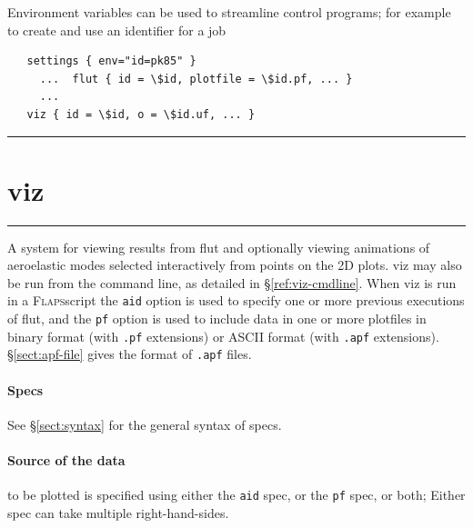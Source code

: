 \documentclass[11pt,openany,twoside]{book}
\makeatletter
\numberwithin{equation}{section}		%
\newcommand{\Cmd}[1]{{\sf #1}}
\newcommand{\Code}[1]{{\small\tt #1}}
\newcommand{\Flaps}{\textsc{Flaps\:}}
\newcommand{\Manpg}[1]{
	\hspace{-\parindent}\rule[-5mm]{\textwidth}{0.3mm}
	\newpage
	\section[\Cmd{#1}]{\sf\Large{#1}} \label{ref:#1} \index{#1@\Cmd{#1}!reference}
	\rule[5mm]{\textwidth}{0.3mm}
}
\newcommand{\Sectref}[1]{\S\ref{#1}}
\makeatother
\begin{document}
% 
\par
Environment variables can be used to streamline control programs;
for example to create and use an identifier for a job 
\begin{lstlisting}
   settings { env="id=pk85" }
     ...  flut { id = \$id, plotfile = \$id.pf, ... }
     ...
   viz { id = \$id, o = \$id.uf, ... }
\end{lstlisting}


\Manpg{viz}

A system for viewing results from \Cmd{flut}
and optionally viewing animations of aeroelastic modes selected
interactively from points on the 2D plots.
\Cmd{viz} may also be run from the command line, as detailed in
\Sectref{ref:viz-cmdline}.
When \Cmd{viz} is run in a \Flaps script the \Code{aid} option
is used to specify one or more previous executions of \Cmd{flut},
and the \Code{pf} option is used to include data in one or more
plotfiles in binary format (with \Code{.pf} extensions) or
ASCII format (with \Code{.apf} extensions).
\Sectref{sect:apf-file} gives the format of \Code{.apf} files.

\paragraph{Specs}
See \Sectref{sect:syntax} for the general syntax of specs.

\paragraph{Source of the data} to be plotted is specified
using either the \Code{aid} spec, or the \Code{pf} spec,
or both; Either spec can take multiple right-hand-sides.
\end{document}
